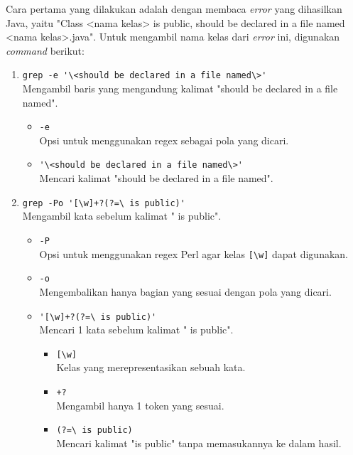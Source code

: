 Cara pertama yang dilakukan adalah dengan membaca \textit{error} yang dihasilkan Java, yaitu "Class <nama kelas> is public, should be declared in a file named <nama kelas>.java". Untuk mengambil nama kelas dari \textit{error} ini, digunakan \textit{command} berikut:
\begin{enumerate}
    \item \verb|grep -e '\<should be declared in a file named\>'| \\ Mengambil baris yang mengandung kalimat "should be declared in a file named".
    \begin{itemize}
        \item \verb|-e| \\ Opsi untuk menggunakan regex sebagai pola yang dicari.
        \item \verb|'\<should be declared in a file named\>'| \\ Mencari kalimat "should be declared in a file named".
    \end{itemize}
    \item \verb|grep -Po '[\w]+?(?=\ is public)'| \\ Mengambil kata sebelum kalimat " is public".
    \begin{itemize}
        \item \verb|-P| \\ Opsi untuk menggunakan regex Perl agar kelas \verb|[\w]| dapat digunakan.
        \item \verb|-o| \\ Mengembalikan hanya bagian yang sesuai dengan pola yang dicari.
        \item \verb|'[\w]+?(?=\ is public)'| \\ Mencari 1 kata sebelum kalimat " is public".
        \begin{itemize}
            \item \verb|[\w]| \\ Kelas yang merepresentasikan sebuah kata.
            \item \verb|+?| \\ Mengambil hanya 1 token yang sesuai.
            \item \verb|(?=\ is public)| \\ Mencari kalimat "is public" tanpa memasukannya ke dalam hasil.
        \end{itemize}
    \end{itemize}
\end{enumerate}

